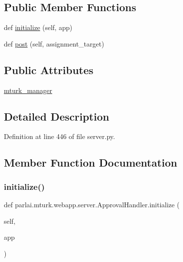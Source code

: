 \subsection*{Public Member Functions}
\begin{DoxyCompactItemize}
\item 
def \hyperlink{classparlai_1_1mturk_1_1webapp_1_1server_1_1ApprovalHandler_a3891a2146e72565874f18385dfc2c11e}{initialize} (self, app)
\item 
def \hyperlink{classparlai_1_1mturk_1_1webapp_1_1server_1_1ApprovalHandler_a94b2c2a69732dde8ea1e92a8b4f5f7ea}{post} (self, assignment\+\_\+target)
\end{DoxyCompactItemize}
\subsection*{Public Attributes}
\begin{DoxyCompactItemize}
\item 
\hyperlink{classparlai_1_1mturk_1_1webapp_1_1server_1_1ApprovalHandler_ac6cbcc9f89912ecbd3b9c677e44225b1}{mturk\+\_\+manager}
\end{DoxyCompactItemize}


\subsection{Detailed Description}


Definition at line 446 of file server.\+py.



\subsection{Member Function Documentation}
\mbox{\label{classparlai_1_1mturk_1_1webapp_1_1server_1_1ApprovalHandler_a3891a2146e72565874f18385dfc2c11e}} 
\subsubsection{\texorpdfstring{initialize()}{initialize()}}
{\footnotesize\ttfamily def parlai.\+mturk.\+webapp.\+server.\+Approval\+Handler.\+initialize (\begin{DoxyParamCaption}\item[{}]{self,  }\item[{}]{app }\end{DoxyParamCaption})}



